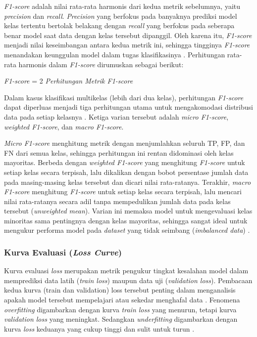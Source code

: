 \textit{F1-score} adalah nilai rata-rata harmonis dari kedua metrik sebelumnya, yaitu \textit{precision} dan \textit{recall}.
\textit{Precision} yang berfokus pada banyaknya prediksi model kelas tertentu bertolak belakang dengan \textit{recall} yang berfokus pada seberapa benar model saat data dengan kelas tersebut dipanggil.
Oleh karena itu, \textit{F1-score} menjadi nilai keseimbangan antara kedua metrik ini, sehingga tingginya \textit{F1-score} menandakan keunggulan model dalam tugas klasifikasinya \cite{powers2011evaluation}.
Perhitungan rata-rata harmonis dalam \textit{F1-score} dirumuskan sebagai berikut:

\begin{equationcaptioned}{
      \textit{F1-score} = 2 \times {}
      \label{eq:f1-score}
  }{
      \textit{Perhitungan Metrik \textit{F1-score}}
  }
  \end{equationcaptioned}
  \medskip

Dalam kasus klasifikasi multikelas (lebih dari dua kelas), perhitungan \textit{F1-score} dapat diperluas menjadi tiga perhitungan utama untuk mengakomodasi distribusi data pada setiap kelasnya \cite{powers2011evaluation}. 
Ketiga varian tersebut adalah \textit{micro F1-score}, \textit{weighted F1-score}, dan \textit{macro F1-score}. \par

\textit{Micro F1-score} menghitung metrik dengan menjumlahkan seluruh TP, FP, dan FN dari semua kelas, sehingga perhitungan ini rentan didominasi oleh kelas mayoritas. 
Berbeda dengan \textit{weighted F1-score} yang menghitung \textit{F1-score} untuk setiap kelas secara terpisah, lalu dikalikan dengan bobot persentase jumlah data pada masing-masing kelas tersebut dan dicari nilai rata-ratanya.
Terakhir, \textit{macro F1-score} menghitung \textit{F1-score} untuk setiap kelas secara terpisah, lalu mencari nilai rata-ratanya secara adil tanpa mempedulikan jumlah data pada kelas tersebut (\textit{unweighted mean}). 
Varian ini memaksa model untuk mengevaluasi kelas minoritas sama pentingnya dengan kelas mayoritas, sehingga sangat ideal untuk mengukur performa model pada \textit{dataset} yang tidak seimbang (\textit{imbalanced data}) \cite{powers2011evaluation}. \par

\subsubsection{Kurva Evaluasi (\textit{Loss Curve})} \label{II.Teori11.3}
Kurva evaluasi \textit{loss} merupakan metrik pengukur tingkat kesalahan model dalam memprediksi data latih (\textit{train loss}) maupun data uji (\textit{validation loss}).
Pembacaan kedua kurva (train dan validation) loss tersebut penting dalam menganalisis apakah model tersebut mempelajari atau sekedar menghafal data \cite{goodfellow2016deep}.
Fenomena \textit{overfitting} digambarkan dengan kurva \textit{train loss} yang menurun, tetapi kurva \textit{validation loss} yang meningkat.
Sedangkan \textit{underfitting} digambarkan dengan kurva \textit{loss} keduanya yang cukup tinggi dan sulit untuk turun \cite{goodfellow2016deep}. \par

